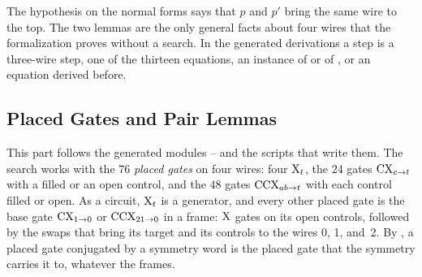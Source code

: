\documentclass[acmsmall,screen,nonacm]{acmart}
\begin{document}
The hypothesis on the normal forms says that $p$ and $p'$ bring the same wire to the top. The two lemmas are the only general facts about four wires that the formalization proves without a search. In the generated derivations a step is a three-wire step, one of the thirteen equations, an instance of  or of , or an equation derived before.

\subsection{Placed Gates and Pair Lemmas}\label{app:xcxccx-pairs}

This part follows the generated modules -- and the scripts that write them. The search works with the $76$ \emph{placed gates} on four wires: four $\mathrm{X}_t$, the $24$ gates $\mathrm{CX}_{c\to t}$ with a filled or an open control, and the $48$ gates $\mathrm{CCX}_{ab\to t}$ with each control filled or open. As a circuit, $\mathrm{X}_t$ is a generator, and every other placed gate is the base gate $\mathrm{CX}_{1\to0}$ or $\mathrm{CCX}_{21\to0}$ in a frame: $\mathrm{X}$ gates on its open controls, followed by the swaps that bring its target and its controls to the wires 0, 1, and~2. By , a placed gate conjugated by a symmetry word is the placed gate that the symmetry carries it to, whatever the frames.
\end{document}
